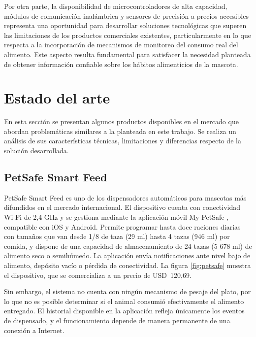 Por otra parte, la disponibilidad de microcontroladores de alta capacidad, módulos de comunicación inalámbrica y sensores de precisión a precios accesibles representa una oportunidad para desarrollar soluciones tecnológicas que superen las limitaciones de los productos comerciales existentes, particularmente en lo que respecta a la incorporación de mecanismos de monitoreo del consumo real del alimento. Este aspecto resulta fundamental para satisfacer la necesidad planteada de obtener información confiable sobre los hábitos alimenticios de la mascota.


\section{Estado del arte}

En esta sección se presentan algunos productos disponibles en el mercado que abordan problemáticas similares a la planteada en este trabajo. Se realiza un análisis de sus características técnicas, limitaciones y diferencias respecto de la solución desarrollada.

\subsection{PetSafe Smart Feed}

PetSafe Smart Feed \cite{petsafe} es uno de los dispensadores automáticos para mascotas más difundidos en el mercado internacional. El dispositivo cuenta con conectividad Wi-Fi de 2,4 GHz y se gestiona mediante la aplicación móvil My PetSafe \cite{mypetsafe_app}, compatible con iOS y Android. Permite programar hasta doce raciones diarias con tamaños que van desde 1/8 de taza (29 ml) hasta 4 tazas (946 ml) por comida, y dispone de una capacidad de almacenamiento de 24 tazas (5 678 ml) de alimento seco o semihúmedo. La aplicación envía notificaciones ante nivel bajo de alimento, depósito vacío o pérdida de conectividad. La figura \ref{fig:petsafe} muestra el dispositivo, que se comercializa 
a un precio de USD~120{,}69.

Sin embargo, el sistema no cuenta con ningún mecanismo de pesaje del plato, por lo que no es posible determinar si el animal consumió efectivamente el alimento entregado. El historial disponible en la aplicación refleja únicamente los eventos de dispensado, y el funcionamiento depende de manera permanente de una conexión a Internet.

